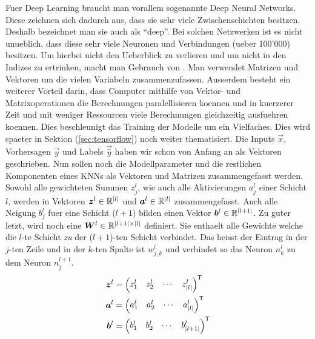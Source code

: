 \par\bigskip
Fuer Deep Learning braucht man vorallem sogenannte Deep Neural Networks. Diese
zeichnen sich dadurch aus, dass sie sehr viele Zwischenschichten besitzen.
Deshalb bezeichnet man sie auch als ``deep''.
Bei solchen Netzwerken ist es nicht unueblich,
dass diese sehr viele Neuronen und Verbindungen (ueber 100'000) besitzen.
Um hierbei nicht den Ueberblick zu verlieren und um nicht in den Indizes zu
ertrinken, macht man Gebrauch von . Man verwendet
Matrizen und Vektoren um die vielen Variabeln zusammenzufassen.
Ausserdem besteht ein weiterer Vorteil darin, dass Computer mithilfe von Vektor-
und Matrixoperationen die Berechnungen paralellisieren koennen und in kuerzerer
Zeit und mit weniger Ressourcen viele Berechnungen gleichzeitig ausfuehren koennen.
Dies beschleunigt das Training der Modelle um
ein Vielfaches. Dies wird spaeter in Sektion
(\ref{sec:tensorflow}) noch weiter thematisiert.
\para{}
Die Inputs $\vec{x}$, Vorhersagen $\vec{y}$ und Labels $\vec{\hat{y}}$ haben wir schon von Anfang an als Vektoren geschrieben.
Nun sollen noch die Modellparameter und die restlichen Komponenten eines KNNs als Vektoren und Matrizen zusammengefasst werden.
Sowohl alle gewichteten Summen $z_j^l$, wie auch alle Aktivierungen $a_j^l$
einer Schicht $l$, werden in Vektoren $\bm{z}^l \in \mathbb{R}^{|l|}$ und
$\bm{a}^l \in \mathbb{R}^{|l|}$ zusammengefasst.
Auch alle Neigung $b_j^l$ fuer eine Schicht ($l+1$) bilden einen Vektor
$\bm{b}^l \in \mathbb{R}^{|l+1|}$.
\para{}
Zu guter letzt, wird noch eine  $\bm{W}^l \in
\mathbb{R}^{|l+1| \times |l|}$
definiert. Sie enthaelt alle Gewichte welche die $l$-te
Schicht \textit{zu} der ($l+1$)-ten Schicht verbindet.
Das heisst der Eintrag in der $j$-ten Zeile und in
der $k$-ten Spalte ist $w_{j,k}^l$ und verbindet so das Neuron $n_k^{l}$ zu
dem Neuron $n_j^{l+1}$.
\\
\begin{align*}
  \bm{z}^l &=  \begin{pmatrix} z_1^l & z_2^l & \cdots & z_{|l|}^l \end{pmatrix}^{\mathsf{T}} \\
  \bm{a}^l &=  \begin{pmatrix} a_1^l & a_2^l & \cdots & a_{|l|}^l \end{pmatrix}^{\mathsf{T}} \\
  \bm{b}^l &=  \begin{pmatrix} b_1^l & b_2^l & \cdots & b_{|l+1|}^l \end{pmatrix}^{\mathsf{T}} \\
\end{align*}
